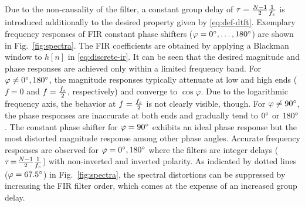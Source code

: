 Due to the non-causality of the filter, a constant group delay of $\tau = \frac{N - 1}{2}\frac{1}{{f}_{s}}$
is introduced additionally to the desired property given by \eqref{eq:def-dtft}.
%
\NewL Exemplary frequency responses of FIR constant phase shifters
($\varphi=0\degree,\ldots,180\degree$)
are shown in Fig.~\ref{fig:spectra}.
The FIR coefficients are obtained by applying
a Blackman window to $h[n]$ in \eqref{eq:discrete-ir}.
It can be seen that the desired magnitude and phase responses
are achieved only within a limited frequency band.
For $\varphi \neq 0\degree, 180\degree$,
the magnitude responses typically
attenuate at low and high ends
($f=0$ and $f=\tfrac{{f}_{s}}{2}$, respectively)
and converge to $\cos\varphi$.
Due to the logarithmic frequency axis,
the behavior at $f=\frac{{f}_{s}}{2}$ is not clearly visible, though.
For $\varphi\neq 90\degree$,
the phase responses are inaccurate at both ends
and gradually tend to $0\degree$ or $180\degree$.
The constant phase shifter for $\varphi=90\degree$ exhibits an ideal phase response
but the most distorted magnitude response among other phase angles.
Accurate frequency responses are observed for $\varphi=0\degree, 180\degree$
where the filters are integer delays ($\tau\!=\!\frac{N-1}{2}\frac{1}{{f}_{s}}$)
with non-inverted and inverted polarity.
As indicated by dotted lines ($\varphi=67.5\degree$) in Fig.~\ref{fig:spectra},
the spectral distortions can be suppressed
by increasing the FIR filter order,
which comes at the expense of an increased group delay.

